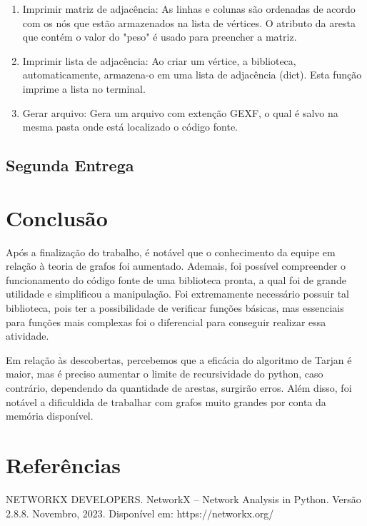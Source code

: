 \documentclass[12pt]{article}
\begin{document}
\begin{enumerate}[itemsep=8pt,parsep=8pt]
    \item Imprimir matriz de adjacência: As linhas e colunas são ordenadas de acordo com os nós que estão armazenados na lista de vértices. O atributo da aresta que contém o valor do "peso" é usado para preencher a matriz.
    
    \item Imprimir lista de adjacência: Ao criar um vértice, a biblioteca, automaticamente, armazena-o em uma lista de adjacência (dict). Esta função imprime a lista no terminal.
    
    \item Gerar arquivo: Gera um arquivo com extenção GEXF, o qual é salvo na mesma pasta onde está localizado o código fonte.
\end{enumerate}

\subsection{Segunda Entrega}


\section{Conclusão}

Após a finalização do trabalho, é notável que o conhecimento da equipe em relação à teoria de grafos foi aumentado. Ademais, foi possível compreender o funcionamento do código fonte de uma biblioteca pronta, a qual foi de grande utilidade e simplificou a manipulação. Foi extremamente necessário possuir tal biblioteca, pois ter a possibilidade de verificar funções básicas, mas essenciais para funções mais complexas foi o diferencial para conseguir realizar essa atividade.

Em relação às descobertas, percebemos que a eficácia do algoritmo de Tarjan é maior, mas é preciso aumentar o limite de recursividade do python, caso contrário, dependendo da quantidade de arestas, surgirão erros. Além disso, foi notável a dificuldida de trabalhar com grafos muito grandes por conta da memória disponível.

\section{Referências}

NETWORKX DEVELOPERS. NetworkX -- Network Analysis in Python. Versão 2.8.8. Novembro, 2023. Disponível em: https://networkx.org/
\end{document}
